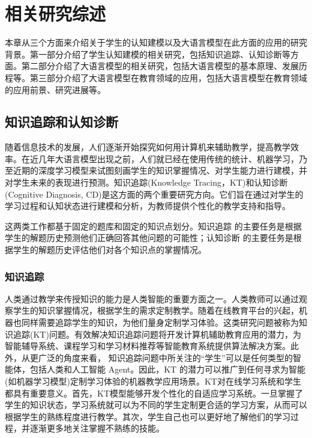 
\chapter{相关研究综述}

本章从三个方面来介绍关于学生的认知建模以及大语言模型在此方面的应用的研究背景。第一部分介绍了学生认知建模的相关研究，包括知识追踪、认知诊断等方面。第二部分介绍了大语言模型的相关研究，包括大语言模型的基本原理、发展历程等。第三部分介绍了大语言模型在教育领域的应用，包括大语言模型在教育领域的应用前景、研究进展等。

\section{知识追踪和认知诊断}

随着信息技术的发展，人们逐渐开始探究如何用计算机来辅助教学，提高教学效率。在近几年大语言模型出现之前，人们就已经在使用传统的统计、机器学习，乃至近期的深度学习模型来试图刻画学生的知识掌握情况、对学生能力进行建模，并对学生未来的表现进行预测。知识追踪(Knowledge Tracing，KT)和认知诊断(Cognitive Diagnosis, CD)是这方面的两个重要研究方向。它们旨在通过对学生的学习过程和认知状态进行建模和分析，为教师提供个性化的教学支持和指导。

这两类工作都基于固定的题库和固定的知识点划分。知识追踪 的主要任务是根据学生的解题历史预测他们正确回答其他问题的可能性；认知诊断 的主要任务是根据学生的解题历史评估他们对各个知识点的掌握情况。

\subsection{知识追踪}

人类通过教学来传授知识的能力是人类智能的重要方面之一。人类教师可以通过观察学生的知识掌握情况，根据学生的需求定制教学。随着在线教育平台的兴起，机器也同样需要追踪学生的知识，为他们量身定制学习体验。这类研究问题被称为知识追踪(KT)问题。有效解决知识追踪问题将开发计算机辅助教育应用的潜力，为智能辅导系统、课程学习和学习材料推荐等智能教育系统提供算法解决方案。此外，从更广泛的角度来看， 知识追踪问题中所关注的“学生”可以是任何类型的智能体，包括人类和人工智能 Agent。因此，KT 的潜力可以推广到任何寻求为智能(如机器学习模型)定制学习体验的机器教学应用场景\cite{abdelrahman2023knowledge}。KT对在线学习系统和学生都具有重要意义。首先，KT模型能够开发个性化的自适应学习系统。一旦掌握了学生的知识状态，学习系统就可以为不同的学生定制更合适的学习方案，从而可以根据学生的熟练程度进行教学。其次，学生自己也可以更好地了解他们的学习过程，并逐渐更多地关注掌握不熟练的技能\cite{liu2019exploiting}。

